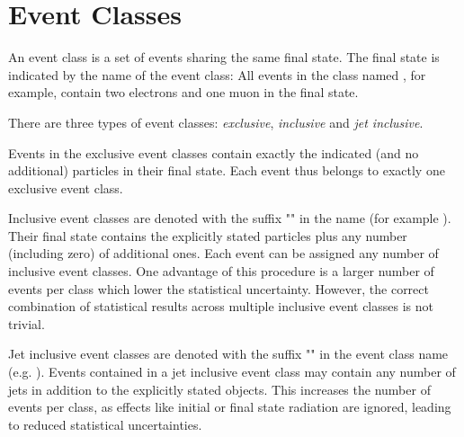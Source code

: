 %
%
%
%
%
%
%


\section{Event Classes}
\label{sec:event_classes}

An event class is a set of events sharing the same final state. The final state is indicated by the name of the event class: All events in the class named \eventclass{2\Pe + 1\Pmu}, for example, contain two electrons and one muon in the final state.

There are three types of event classes: \emph{exclusive}, \emph{inclusive} and \emph{jet inclusive}.

Events in the exclusive event classes contain exactly the indicated (and no additional) particles in their final state. Each event thus belongs to exactly one exclusive event class.

Inclusive event classes are denoted with the suffix "" in the name (for example ). Their final state contains the explicitly stated particles plus any number (including zero) of additional ones.  Each event can be assigned any number of inclusive event classes. One advantage of this procedure is a larger number of events per class which lower the statistical uncertainty. However, the correct combination of statistical results across multiple inclusive event classes is not trivial.

Jet inclusive event classes are denoted with the suffix "" in the event class name (e.g. ). Events contained in a jet inclusive event class may contain any number of jets in addition to the explicitly stated objects. This increases the number of events per class, as effects like initial or final state radiation are ignored, leading to reduced statistical uncertainties.

